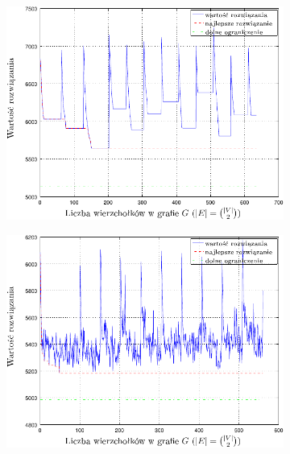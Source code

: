 \begin{figure}[!htbp]
	\null\hfill
	\begin{subfigure}[b]{0.32\textwidth}
		\includegraphics[width=\textwidth]{Chapter_VI/RRIMST5-example/RRIMST5_psfrag}
		\caption{}
		\label{fig:rrimst2:a}
	\end{subfigure}
	\hfill
	\begin{subfigure}[b]{0.32\textwidth}
		\includegraphics[width=\textwidth]{Chapter_VI/RRIMST6-example/RRIMST6_psfrag}
		\caption{}
		\label{fig:rrimst2:b}
	\end{subfigure}
	\hfill
	\begin{subfigure}[b]{0.32\textwidth}

\end{subfigure}
\end{figure}
